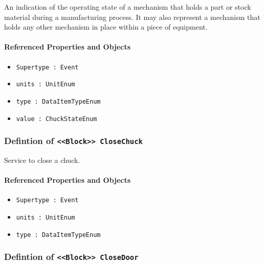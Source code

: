 \FloatBarrier

An indication of the operating state of a mechanism that holds a part or stock material during a manufacturing process. It may also represent a mechanism that holds any other mechanism in place within a piece of equipment.

\FloatBarrier
\paragraph{Referenced Properties and Objects}

\begin{itemize}
\item \texttt{Supertype : Event}

\item \texttt{units : UnitEnum}

\item \texttt{type : DataItemTypeEnum}

\item \texttt{value : ChuckStateEnum}

\end{itemize}
\FloatBarrier
\subsubsection{Defintion of \texttt{<<Block>> CloseChuck}}
  \label{type:CloseChuck}

\FloatBarrier

Service to close a chuck.

\FloatBarrier
\paragraph{Referenced Properties and Objects}

\begin{itemize}
\item \texttt{Supertype : Event}

\item \texttt{units : UnitEnum}

\item \texttt{type : DataItemTypeEnum}

\end{itemize}
\FloatBarrier
\subsubsection{Defintion of \texttt{<<Block>> CloseDoor}}
  \label{type:CloseDoor}

\FloatBarrier

